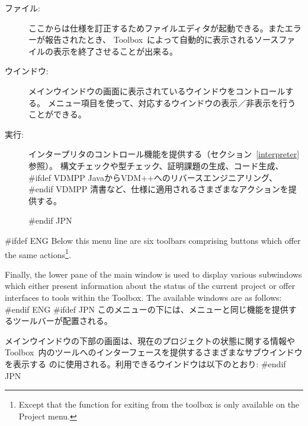 \documentclass[\pformat,12pt]{article}
\newcommand{\Toolbox}{Toolbox}
\newcommand{\Toolbox}{Toolbox}
\newcommand{\guicmd}[1]{{\sf #1}}
\newcommand{\guicmd}[1]{{\gt #1}}
\begin{document}
\begin{description}
\item[\guicmd{ファイル}:]
  ここからは仕様を訂正するためファイルエディタが起動できる。またエラーが報告されたとき、
  \Toolbox\ によって自動的に表示されるソースファイルの表示を終了させることが出来る。

\item[\guicmd{ウインドウ}:]
  メインウインドウの画面に表示されているウインドウをコントロールする。
  メニュー項目を使って、対応するウインドウの表示／非表示を行うことができる。

\item[\guicmd{実行}:]
  インタープリタのコントロール機能を提供する（セクション~\ref{interpreter}参照）。
  構文チェックや型チェック、証明課題の生成、コード生成、
#ifdef VDMPP 
JavaからVDM++へのリバースエンジニアリング、
#endif VDMPP 
  清書など、仕様に適用されるさまざまなアクションを提供する。

#endif JPN
\end{description}

#ifdef ENG
  Below this menu line are six toolbars comprising buttons which offer the same
  actions\footnote{Except that the function for exiting from the toolbox
  is only available on the \guicmd{Project} menu.}.
  
  Finally, the lower pane of the main window is used to display various
  subwindows which either present information about the status of the
  current project or offer interfaces to tools within the \Toolbox. The
  available windows are as follows:
#endif ENG
#ifdef JPN
  このメニューの下には、メニューと同じ機能を提供するツールバーが配置される。
  
  メインウインドウの下部の画面は、現在のプロジェクトの状態に関する情報や
  \Toolbox\ 内のツールへのインターフェースを提供するさまざまなサブウインドウを表示する
  のに使用される。利用できるウインドウは以下のとおり:
#endif JPN
\end{document}
